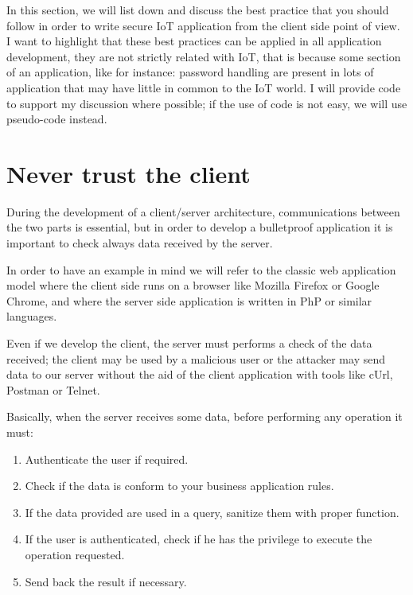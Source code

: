 In this section, we will list down and discuss the best practice that you should follow in order to write secure IoT application from the client side point of view.\newline
I want to highlight that these best practices can be applied in all application development, they are not strictly related with IoT, that is because some section of an application, like for instance: password handling are present in lots of application that may have little in common to the IoT world.\newline
I will provide code to support my discussion where possible; if the use of code is not easy, we will use pseudo-code instead.\newline

\section{Never trust the client}
During the development of a client/server architecture, communications between the two parts is essential, but in order to develop a bulletproof application it is important to check always data received by the server.\newline

In order to have an example in mind we will refer to the classic web application model where the client side runs on a browser like Mozilla Firefox or Google Chrome, and where the server side application is written in PhP or similar languages.\newline

Even if we develop the client, the server must performs a check of the data received; the client may be used by a malicious user or the attacker may send data to our server without the aid of the client application with tools like cUrl, Postman or Telnet.\newline

Basically, when the server receives some data, before performing any operation it must:
\begin{enumerate}
	\item Authenticate the user if required.
	\item Check if the data is conform to your business application rules.
	\item If the data provided are used in a query, sanitize them with proper function.
	\item If the user is authenticated, check if he has the privilege to execute the operation requested.
	\item Send back the result if necessary.
\end{enumerate}

